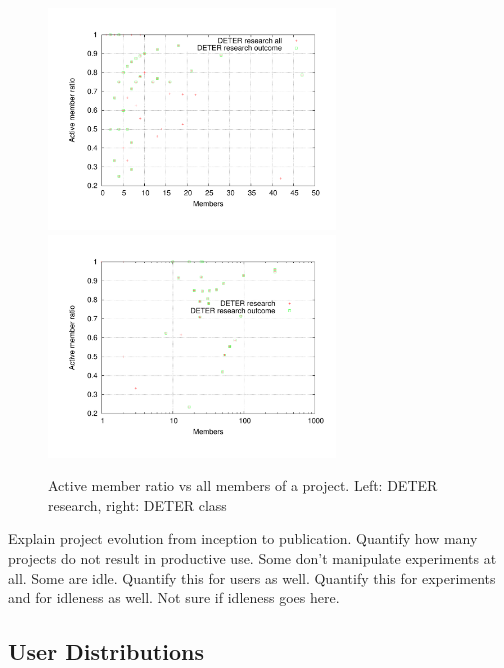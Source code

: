 \begin{figure}[htbp] \begin{center} \includegraphics[width=3in,
type=pdf,ext=.pdf,read=.pdf]{figs/proj.uservsauserres.gnu}
\includegraphics[width=3in,
type=pdf,ext=.pdf,read=.pdf]{figs/proj.uservsausercl.gnu}
\caption{Active member ratio vs all members of a project. Left: DETER
research, right: DETER class} \label{projuservsauser} \end{center}
\end{figure}

Explain project evolution from inception to publication. Quantify how
many projects do not result in productive use. Some don't manipulate
experiments at all. Some are idle. Quantify this for users as well.
Quantify this for experiments and for idleness as well. Not sure if
idleness goes here.



\subsection{User Distributions} 



